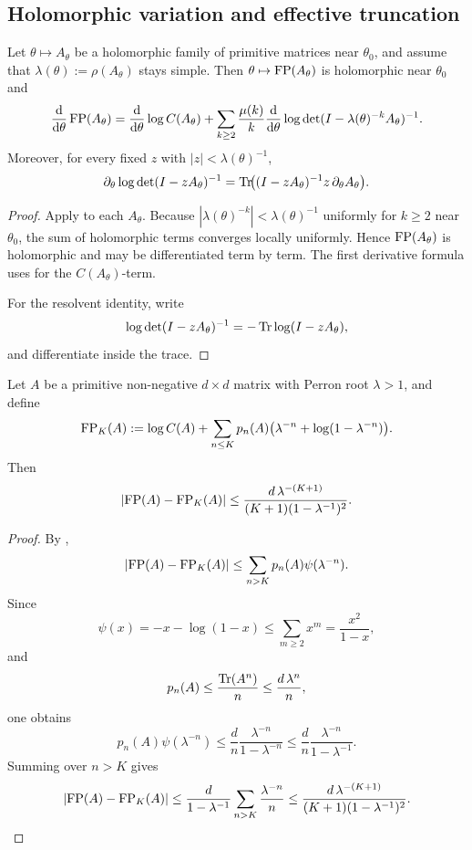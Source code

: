 \subsection{Holomorphic variation and effective truncation}

\begin{theorem}
  \label{thm:logM-holomorphic-variation}
  Let \(\theta\mapsto A_\theta\) be a holomorphic family of primitive
  matrices near \(\theta_0\), and assume that
  \(\lambda(\theta):=\rho(A_\theta)\) stays simple. Then
  \(\theta\mapsto\operatorname{FP}(A_\theta)\) is holomorphic near \(\theta_0\) and
  \[
    \frac{\mathrm{d}}{\mathrm{d}\theta}\operatorname{FP}(A_\theta)
    =\frac{\mathrm{d}}{\mathrm{d}\theta}\log C(A_\theta)
     +\sum_{k\ge 2}\frac{\mu(k)}{k}
      \frac{\mathrm{d}}{\mathrm{d}\theta}
      \log\det(I-\lambda(\theta)^{-k}A_\theta)^{-1}.
  \]
  Moreover, for every fixed \(z\) with \(|z|<\lambda(\theta)^{-1}\),
  \[
    \partial_\theta\log\det(I-zA_\theta)^{-1}
    =\operatorname{Tr}\!\bigl((I-zA_\theta)^{-1}z\,\partial_\theta A_\theta\bigr).
  \]
\end{theorem}

\begin{proof}
  Apply  to each \(A_\theta\).
  Because \(|\lambda(\theta)^{-k}|<\lambda(\theta)^{-1}\) uniformly for
  \(k\ge 2\) near \(\theta_0\), the sum of holomorphic terms converges
  locally uniformly. Hence \(\operatorname{FP}(A_\theta)\) is holomorphic and may
  be differentiated term by term. The first derivative formula uses
   for
  the \(C(A_\theta)\)-term.

  For the resolvent identity, write
  \[
    \log\det(I-zA_\theta)^{-1}=-\operatorname{Tr}\log(I-zA_\theta),
  \]
  and differentiate inside the trace.
\end{proof}

\begin{theorem}
  \label{thm:logM-truncation-bound}
  Let \(A\) be a primitive non-negative \(d\times d\) matrix with
  Perron root \(\lambda>1\), and define
  \[
    \operatorname{FP}_K(A)
    :=\log C(A)
      +\sum_{n\le K}p_n(A)
       \bigl(\lambda^{-n}+\log(1-\lambda^{-n})\bigr).
  \]
  Then
  \[
    \lvert \operatorname{FP}(A)-\operatorname{FP}_K(A) \rvert
    \le
    \frac{d\,\lambda^{-(K+1)}}{(K+1)(1-\lambda^{-1})^2}.
  \]
\end{theorem}

\begin{proof}
  By ,
  \[
    \lvert \operatorname{FP}(A)-\operatorname{FP}_K(A) \rvert
    \le \sum_{n>K} p_n(A)\psi(\lambda^{-n}).
  \]
  Since
  \[
    \psi(x)=-x-\log(1-x)\le \sum_{m\ge 2}x^m=\frac{x^2}{1-x},
  \]
  and
  \[
    p_n(A)\le \frac{\operatorname{Tr}(A^n)}{n}\le \frac{d\,\lambda^n}{n},
  \]
  one obtains
  \[
    p_n(A)\psi(\lambda^{-n})
    \le \frac{d}{n}\frac{\lambda^{-n}}{1-\lambda^{-n}}
    \le \frac{d}{n}\frac{\lambda^{-n}}{1-\lambda^{-1}}.
  \]
  Summing over \(n>K\) gives
  \[
    \lvert \operatorname{FP}(A)-\operatorname{FP}_K(A) \rvert
    \le \frac{d}{1-\lambda^{-1}}
      \sum_{n>K}\frac{\lambda^{-n}}{n}
    \le
    \frac{d\,\lambda^{-(K+1)}}{(K+1)(1-\lambda^{-1})^2}.
  \]
\end{proof}

